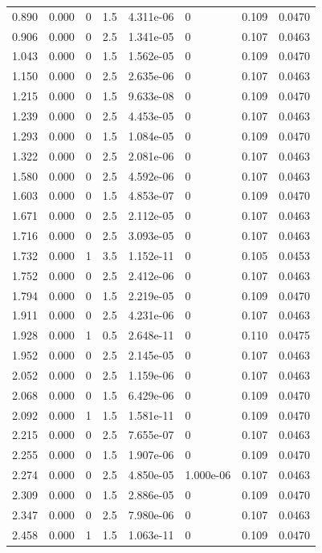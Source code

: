 \documentclass[preview]{standalone}
\begin{document}
{{\begin{tabular}{L{1.2cm}C{1.2cm} C{0.3cm}C{0.5cm} C{1.4cm}C{1.4cm} C{1.4cm}C{1.4cm}}
  0.890  &  0.000  & 0     & 1.5 &  4.311e-06  & 0  & 0.109 &  0.0470   \\ 
  0.906  &  0.000  & 0     & 2.5 &  1.341e-05  & 0  & 0.107 &  0.0463   \\ 
  1.043  &  0.000  & 0     & 1.5 &  1.562e-05  & 0  & 0.109 &  0.0470   \\ 
  1.150  &  0.000  & 0     & 2.5 &  2.635e-06  & 0  & 0.107 &  0.0463   \\ 
  1.215  &  0.000  & 0     & 1.5 &  9.633e-08  & 0  & 0.109 &  0.0470   \\ 
  1.239  &  0.000  & 0     & 2.5 &  4.453e-05  & 0  & 0.107 &  0.0463   \\ 
  1.293  &  0.000  & 0     & 1.5 &  1.084e-05  & 0  & 0.109 &  0.0470   \\ 
  1.322  &  0.000  & 0     & 2.5 &  2.081e-06  & 0  & 0.107 &  0.0463   \\ 
  1.580  &  0.000  & 0     & 2.5 &  4.592e-06  & 0  & 0.107 &  0.0463   \\ 
  1.603  &  0.000  & 0     & 1.5 &  4.853e-07  & 0  & 0.109 &  0.0470   \\ 
  1.671  &  0.000  & 0     & 2.5 &  2.112e-05  & 0  & 0.107 &  0.0463   \\ 
  1.716  &  0.000  & 0     & 2.5 &  3.093e-05  & 0  & 0.107 &  0.0463   \\ 
  1.732  &  0.000  & 1     & 3.5 &  1.152e-11  & 0  & 0.105 &  0.0453   \\ 
  1.752  &  0.000  & 0     & 2.5 &  2.412e-06  & 0  & 0.107 &  0.0463   \\ 
  1.794  &  0.000  & 0     & 1.5 &  2.219e-05  & 0  & 0.109 &  0.0470   \\ 
  1.911  &  0.000  & 0     & 2.5 &  4.231e-06  & 0  & 0.107 &  0.0463   \\ 
  1.928  &  0.000  & 1     & 0.5 &  2.648e-11  & 0  & 0.110 &  0.0475   \\ 
  1.952  &  0.000  & 0     & 2.5 &  2.145e-05  & 0  & 0.107 &  0.0463   \\ 
  2.052  &  0.000  & 0     & 2.5 &  1.159e-06  & 0  & 0.107 &  0.0463   \\ 
  2.068  &  0.000  & 0     & 1.5 &  6.429e-06  & 0  & 0.109 &  0.0470   \\ 
  2.092  &  0.000  & 1     & 1.5 &  1.581e-11  & 0  & 0.109 &  0.0470   \\ 
  2.215  &  0.000  & 0     & 2.5 &  7.655e-07  & 0  & 0.107 &  0.0463   \\ 
  2.255  &  0.000  & 0     & 1.5 &  1.907e-06  & 0  & 0.109 &  0.0470   \\ 
  2.274  &  0.000  & 0     & 2.5 &  4.850e-05  & 1.000e-06  & 0.107 &  0.0463   \\ 
  2.309  &  0.000  & 0     & 1.5 &  2.886e-05  & 0  & 0.109 &  0.0470   \\ 
  2.347  &  0.000  & 0     & 2.5 &  7.980e-06  & 0  & 0.107 &  0.0463   \\ 
  2.458  &  0.000  & 1     & 1.5 &  1.063e-11  & 0  & 0.109 &  0.0470   \\ 
\hline 
\end{tabular} 

}}
\end{document}
